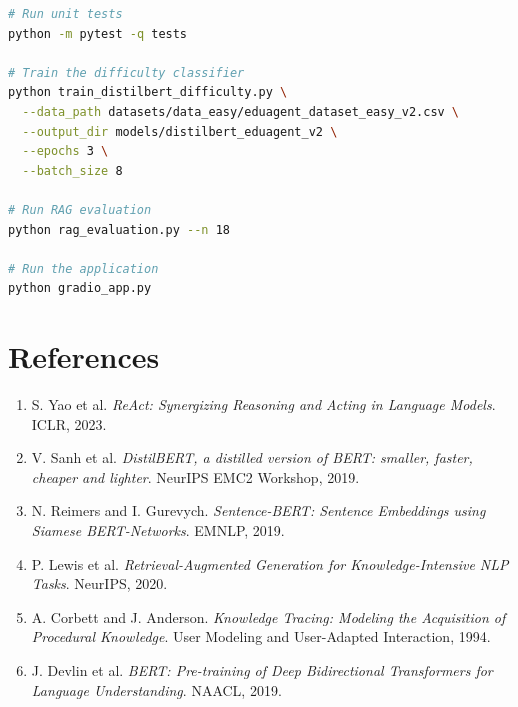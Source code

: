 \documentclass[11pt,a4paper]{article}
\begin{document}
\begin{lstlisting}[language=bash]
# Run unit tests
python -m pytest -q tests

# Train the difficulty classifier
python train_distilbert_difficulty.py \
  --data_path datasets/data_easy/eduagent_dataset_easy_v2.csv \
  --output_dir models/distilbert_eduagent_v2 \
  --epochs 3 \
  --batch_size 8

# Run RAG evaluation
python rag_evaluation.py --n 18

# Run the application
python gradio_app.py
\end{lstlisting}

\section*{References}
\begin{enumerate}
    \item S. Yao et al. \textit{ReAct: Synergizing Reasoning and Acting in Language Models}. ICLR, 2023.
    \item V. Sanh et al. \textit{DistilBERT, a distilled version of BERT: smaller, faster, cheaper and lighter}. NeurIPS EMC2 Workshop, 2019.
    \item N. Reimers and I. Gurevych. \textit{Sentence-BERT: Sentence Embeddings using Siamese BERT-Networks}. EMNLP, 2019.
    \item P. Lewis et al. \textit{Retrieval-Augmented Generation for Knowledge-Intensive NLP Tasks}. NeurIPS, 2020.
    \item A. Corbett and J. Anderson. \textit{Knowledge Tracing: Modeling the Acquisition of Procedural Knowledge}. User Modeling and User-Adapted Interaction, 1994.
    \item J. Devlin et al. \textit{BERT: Pre-training of Deep Bidirectional Transformers for Language Understanding}. NAACL, 2019.
\end{enumerate}
\end{document}
